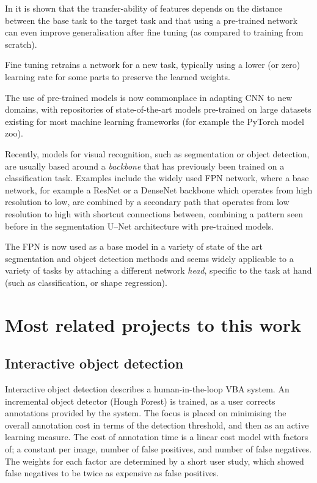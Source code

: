 In \cite{Yosinski} it is shown that the transfer-ability of features depends on the distance between the base task to the target task and that using a pre-trained network can even improve generalisation after fine tuning (as compared to training from scratch).

Fine tuning retrains a network for a new task, typically using a lower (or zero) learning rate for some parts to preserve the learned weights. 

The use of pre-trained models is now commonplace in adapting \gls{CNN} to new domains, with repositories of state-of-the-art models pre-trained on large datasets existing for most machine learning frameworks (for example the PyTorch \cite{Paszke2017} model zoo). 

Recently, models for visual recognition, such as segmentation or object detection, are usually based around a \emph{backbone} that has previously been trained on a classification task. Examples include the widely used \gls{FPN} network, \cite{Lin2017a} where a base network, for example a ResNet \cite{He} or a DenseNet \cite{Huang2016} backbone which operates from high resolution to low, are combined by a secondary path that operates from low resolution to high with shortcut connections between, combining a pattern seen before in the segmentation U--Net \cite{Ronneberger2015} architecture with pre-trained models.

The \gls{FPN} is now used as a base model in a variety of state of the art segmentation and object detection methods and seems widely applicable to a variety of tasks by attaching a different network \emph{head}, specific to the task at hand (such as classification, or shape regression).

\section {Most related projects to this work}
\label{sec:closest}

\subsection {Interactive object detection \cite{Yao2012}}

Interactive object detection \cite{Yao2012} describes a human-in-the-loop \gls{VBA} system. An incremental object detector (Hough Forest) is trained, as a user corrects annotations provided by the system. The focus is placed on minimising the overall annotation cost in terms of the detection threshold, and then as an active learning measure. 
The cost of annotation time is a linear cost model with factors of; a constant per image, number of false positives, and number of false negatives. The weights for each factor are determined by a short user study, which showed false negatives to be twice as expensive as false positives. 

